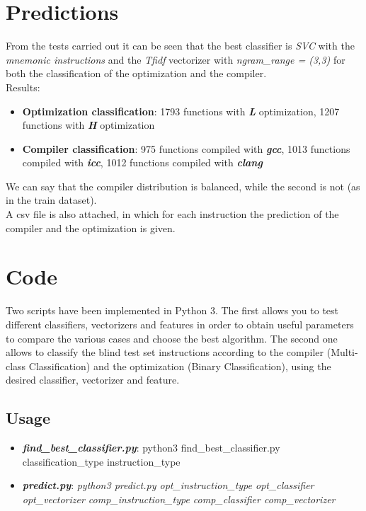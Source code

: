 \documentclass[11pt]{article}
\begin{document}
\section{Predictions}
From the tests carried out it can be seen that the best classifier is \textit{SVC} with the \textit{mnemonic instructions} and the \textit{Tfidf} vectorizer with \textit{ngram\_range = (3,3)}  for both the classification of the optimization and the compiler. \\
Results:
\begin{itemize}
	\item \textbf{Optimization classification}: 1793 functions with \textbf{\textit{L}} optimization, 1207 functions with \textbf{\textit{H}} optimization
	\item \textbf{Compiler classification}: 975 functions compiled with \textbf{\textit{gcc}}, 1013 functions compiled with \textbf{\textit{icc}}, 1012 functions compiled with \textbf{\textit{clang}}
\end{itemize}
We can say that the compiler distribution is balanced, while the second is not (as in the train dataset). \\
A csv file is also attached, in which for each instruction the prediction of the compiler and the optimization is given.

\section{Code}
Two scripts have been implemented in Python 3. The first allows you to test different classifiers, vectorizers and features in order to obtain useful parameters to compare the various cases and choose the best algorithm. The second one allows to classify the blind test set instructions according to the compiler (Multi-class Classification) and the optimization (Binary Classification), using the desired classifier, vectorizer and feature.

\subsection{Usage}
\begin{itemize}
	\item \textbf{\textit{find\_best\_classifier.py}}: python3 find\_best\_classifier.py classification\_type instruction\_type
	\item \textbf{\textit{predict.py}}: \textit{python3 predict.py opt\_instruction\_type opt\_classifier opt\_vectorizer comp\_instruction\_type comp\_classifier comp\_vectorizer}
\end{itemize} 
\end{document}
